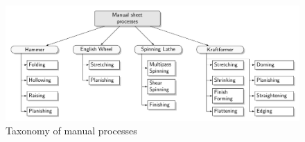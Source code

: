 \begin{figure}[h]
	\centering
    \includegraphics[width=\linewidth]{Diagrams/Taxonomy3.pdf}
    \caption{Taxonomy of manual processes}
    \label{fig:ManualTaxonomy}
\end{figure}





